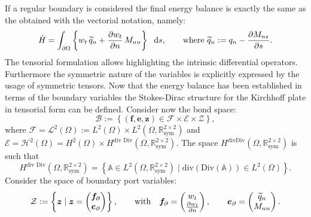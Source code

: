 \documentclass[preprint,12pt]{elsarticle}
\newcommand{\secondReviewer}[1]{\textcolor{blue!80!black}{#1}}
\begin{document}
If a regular boundary is considered the final energy balance is exactly the same as the obtained with the vectorial notation, namely:
\begin{equation}
\dot{H} = \int_{\partial \Omega} \left\{ w_t \, \widetilde{q}_n + \diffp{w_t}{n} \, M_{nn}\right\} \ \d{s},  \qquad \text{where }\widetilde{q}_n := q_n - \diffp{M_{ns}}{s}.
\end{equation} 
The tensorial formulation allows highlighting the intrinsic differential operators. Furthermore the symmetric nature of the variables is explicitly expressed by the usage of symmetric tensors. \secondReviewer{Now that the energy balance has been established in terms of the boundary variables the Stokes-Dirac structure for the Kirchhoff plate in tensorial form can be defined. Consider now the bond space:
\begin{equation}
\label{eq:bondKir}
\mathcal{B} := \left\{(\bm{f}, \bm{e}, \bm{z}) \in \mathcal{F} \times \mathcal{E} \times \mathcal{Z} \right\},
\end{equation}
where $\mathcal{F}=  \mathscr{L}^2(\Omega) :=  L^2(\Omega) \times L^2(\Omega, \mathbb{R}^{2 \times 2}_{\text{sym}})$ and $ \mathcal{E} =  \mathscr{H}^2(\Omega) = H^{2}(\Omega) \times H^{\text{div Div}}(\Omega, \mathbb{R}^{2 \times 2}_{\text{sym}})$. The space $H^{\text{divDiv}}(\Omega, \mathbb{R}^{2 \times 2}_{\text{sym}})$ is such that
\[
H^{\text{div Div}}(\Omega, \mathbb{R}^{2 \times 2}_{\text{sym}}) = \left\{ \mathbb{A} \in L^2(\Omega, \mathbb{R}^{2 \times 2}_{\text{sym}}) \; \vert \; \mathrm{div}(\mathrm{Div}(\mathbb{A})) \in L^2(\Omega) \right\}.
\] Consider the space of boundary port variables:
\begin{equation}
\begin{gathered}
\mathcal{Z} := \left\{ \bm{z} \; \vert \; \bm{z} = \begin{pmatrix} \bm{f}_{\partial} \\ \bm{e}_{\partial} \end{pmatrix} \right\}, \qquad \text{with} \quad
\bm{f}_\partial = 
\begin{pmatrix}
w_t \\ \diffp{w_t}{n} \\
\end{pmatrix}, \qquad
\bm{e}_\partial = 
\begin{pmatrix}
\widetilde{q}_n \\ M_{nn} \\
\end{pmatrix}.
\end{gathered}

\end{equation}}
\end{document}
